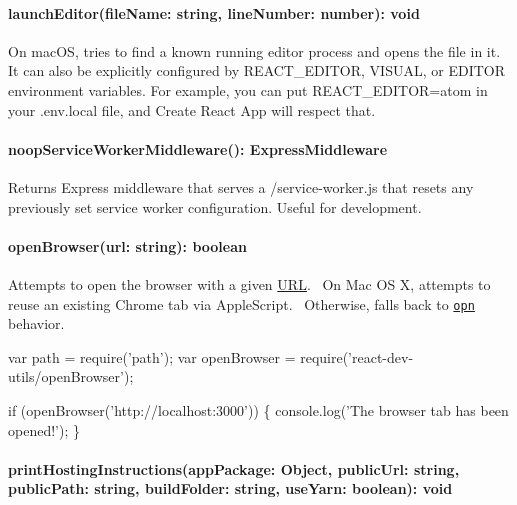 \paragraph*{{\ttfamily launch\+Editor(file\+Name\+: string, line\+Number\+: number)\+: void}}

On mac\+OS, tries to find a known running editor process and opens the file in it. It can also be explicitly configured by {\ttfamily R\+E\+A\+C\+T\+\_\+\+E\+D\+I\+T\+OR}, {\ttfamily V\+I\+S\+U\+AL}, or {\ttfamily E\+D\+I\+T\+OR} environment variables. For example, you can put {\ttfamily R\+E\+A\+C\+T\+\_\+\+E\+D\+I\+T\+OR=atom} in your {\ttfamily .env.\+local} file, and Create React App will respect that.

\paragraph*{{\ttfamily noop\+Service\+Worker\+Middleware()\+: Express\+Middleware}}

Returns Express middleware that serves a {\ttfamily /service-\/worker.js} that resets any previously set service worker configuration. Useful for development.

\paragraph*{{\ttfamily open\+Browser(url\+: string)\+: boolean}}

Attempts to open the browser with a given \mbox{\hyperlink{namespace_u_r_l}{U\+RL}}.~\newline
 On Mac OS X, attempts to reuse an existing Chrome tab via Apple\+Script.~\newline
 Otherwise, falls back to \href{https://github.com/sindresorhus/opn}{\tt opn} behavior.


\begin{DoxyCode}
var path = require('path');
var openBrowser = require('react-dev-utils/openBrowser');

if (openBrowser('http://localhost:3000')) \{
  console.log('The browser tab has been opened!');
\}
\end{DoxyCode}


\paragraph*{{\ttfamily print\+Hosting\+Instructions(app\+Package\+: Object, public\+Url\+: string, public\+Path\+: string, build\+Folder\+: string, use\+Yarn\+: boolean)\+: void}}

